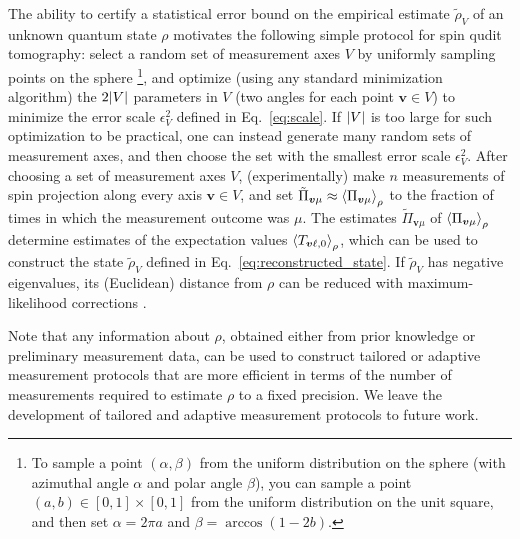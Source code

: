 \documentclass[notitlepage,twocolumn]{revtex4-2}
\newcommand{\p}[1]{\left(#1\right)} %
\newcommand{\bk}{\Braket} %
\renewcommand{\v}{\bm} %
\begin{document}
The ability to certify a statistical error bound on the empirical estimate $\tilde\rho_V$ of an unknown quantum state $\rho$ motivates the following simple protocol for spin qudit tomography: select a random set of measurement axes $V$ by uniformly sampling points on the sphere \footnote{To sample a point $\p{\alpha,\beta}$ from the uniform distribution on the sphere (with azimuthal angle $\alpha$ and polar angle $\beta$), you can sample a point $\p{a,b}\in[0,1]\times[0,1]$ from the uniform distribution on the unit square, and then set $\alpha=2\pi a$ and $\beta=\arccos\p{1-2b}$.}, and optimize (using any standard minimization algorithm) the $2\abs{V}$ parameters in $V$ (two angles for each point $\v v\in V$) to minimize the error scale $\epsilon_V^2$ defined in Eq.~\eqref{eq:scale}.
If $\abs{V}$ is too large for such optimization  to be practical, one can instead generate many random sets of measurement axes, and then choose the set with the smallest error scale $\epsilon_V^2$.
After choosing a set of measurement axes $V$, (experimentally) make $n$ measurements of spin projection along every axis $\v v\in V$, and set $\tilde\Pi_{\v v\mu}\approx\bk{\Pi_{\v v\mu}}_\rho$ to the fraction of times in which the measurement outcome was $\mu$.
The estimates $\tilde\Pi_{\v v\mu}$ of $\bk{\Pi_{\v v\mu}}_\rho$ determine estimates of the expectation values $\bk{T_{\v v\ell,0}}_\rho$, which can be used to construct the state $\tilde\rho_V$ defined in Eq.~\eqref{eq:reconstructed_state}.
If $\tilde\rho_V$ has negative eigenvalues, its (Euclidean) distance from $\rho$ can be reduced with maximum-likelihood corrections \cite{smolin2012efficient}.

Note that any information about $\rho$, obtained either from prior knowledge or preliminary measurement data, can be used to construct tailored or adaptive measurement protocols \cite{pereira2018adaptive} that are more efficient in terms of the number of measurements required to estimate $\rho$ to a fixed precision.
We leave the development of tailored and adaptive measurement protocols to future work.
\end{document}
